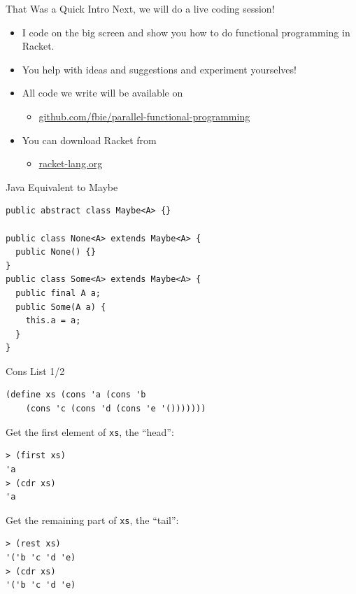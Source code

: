 \documentclass{beamer}
\begin{document}
\begin{frame}{That Was a Quick Intro}
  Next, we will do a live coding session!

  \begin{itemize}
  \pause{} \item I code on the big screen and show you how to do functional programming in Racket.
  \pause{} \item You help with ideas and suggestions and experiment yourselves!
  \pause{} \item All code we write will be available on
  \begin{itemize}
  \item \url{github.com/fbie/parallel-functional-programming}
  \end{itemize}
  \pause{} \item You can download Racket from
  \begin{itemize}
  \item \url{racket-lang.org}
  \end{itemize}
  \end{itemize}
\end{frame}

\begin{frame}[fragile]{Java Equivalent to Maybe}
\begin{lstlisting}[style=Java]
public abstract class Maybe<A> {}

public class None<A> extends Maybe<A> {
  public None() {}
}
public class Some<A> extends Maybe<A> {
  public final A a;
  public Some(A a) {
    this.a = a;
  }
}
\end{lstlisting}
\end{frame}

\begin{frame}[fragile]{Cons List 1/2}
\begin{lstlisting}
(define xs (cons 'a (cons 'b
    (cons 'c (cons 'd (cons 'e '()))))))
\end{lstlisting}

\pause{}

Get the first element of \lstinline{xs}, the ``head'':

\begin{lstlisting}
> (first xs)
'a
> (cdr xs)
'a
\end{lstlisting}

\pause{}

Get the remaining part of \lstinline{xs}, the ``tail'':

\begin{lstlisting}
> (rest xs)
'('b 'c 'd 'e)
> (cdr xs)
'('b 'c 'd 'e)
\end{lstlisting}
\end{frame}
\end{document}
